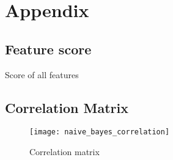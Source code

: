 
\section{Appendix}

\subsection{Feature score}%
\label{sub:full-table-feature}

\begin{table}[H]
    \centering
    \caption{Score of all features}%
    \label{tab:features-all}
    
\end{table}


\subsection{Correlation Matrix}%

\begin{figure}[H]
    \centering
    \texttt{[image: naive\_bayes\_correlation]}
    \caption{Correlation matrix}%
    \label{fig:naive_bayes_correlation}
\end{figure}